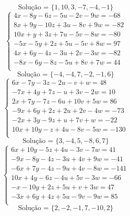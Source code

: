 \documentclass[12pt,oneside,a4paper]{article}
\begin{document}
\begin{equation*}
\text{Solução = }\{1,10,3,-7,-4,-1\}
\end{equation*}
\vspace{\baselineskip}
\begin{equation*}
\begin{cases}
4x-8y-6z-5u-2v-9w=-68 \\
8x+9y-10z+3u-8v+9w=-82 \\
10x+y+3z+7u-5v-8w=-80 \\
-5x-5y+2z+5u-5v+8w=97 \\
4x+6y-4z-3u+2v-3w=-82 \\
-8x-6y-8z-5u+8v+7w=44 \\
\end{cases}
\end{equation*}
\begin{equation*}
\text{Solução = }\{-4,-4,7,-2,-1,6\}
\end{equation*}
\vspace{\baselineskip}
\begin{equation*}
\begin{cases}
6x-7y-3z-2u-v+w=48 \\
-7x+4y+7z-u+3v-2w=10 \\
2x+7y-7z-6u+10v+5w=86 \\
-9x+6y+2z+2u+2v-4w=-73 \\
-2x+3y-9z+u+7v+w=-22 \\
10x+10y-z+4u-8v-5w=-130 \\
\end{cases}
\end{equation*}
\begin{equation*}
\text{Solução = }\{3,-4,5,-8,6,7\}
\end{equation*}
\vspace{\baselineskip}
\begin{equation*}
\begin{cases}
6x+10y-5z+4u-3v-7w=41 \\
-9x-8y-4z-3u+4v+9w=-41 \\
-6x+7y-4z-9u+4v-8w=-141 \\
10x+4y-6z-4u+5v-3w=-66 \\
-x-10y+2z+5u+v+3w=47 \\
-3x+6y+4z+5u-9v-9w=85 \\
\end{cases}
\end{equation*}
\begin{equation*}
\text{Solução = }\{2,-2,-1,7,-10,2\}
\end{equation*}
\end{document}
